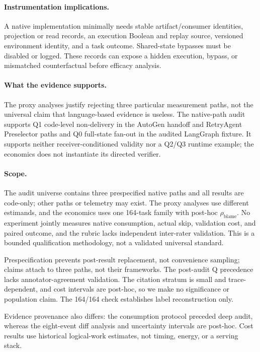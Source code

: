 \documentclass[letterpaper]{article} %
\begin{document}
\paragraph{Instrumentation implications.}
A native implementation minimally needs stable artifact/consumer identities,
projection or read records, an execution Boolean and replay source, versioned
environment identity, and a task outcome. Shared-state bypasses must be
disabled or logged. These records can expose a hidden execution, bypass, or
mismatched counterfactual before efficacy analysis.

\paragraph{What the evidence supports.}
The proxy analyses justify rejecting three particular measurement paths, not
the universal claim that language-based evidence is useless. The native-path
audit supports Q1 code-level non-delivery in the AutoGen handoff and RetryAgent
Preselector paths and Q0 full-state fan-out in the audited LangGraph fixture.
It supports neither receiver-conditioned validity nor a Q2/Q3 runtime example;
the economics does not instantiate its directed verifier.

\paragraph{Scope.}
The audit universe contains three prespecified native paths and all results are
code-only; other paths or telemetry may exist. The proxy analyses use different
estimands, and the economics uses one 164-task family with post-hoc
$\rho_{\mathrm{blame}}$. No experiment jointly measures native consumption,
actual skip, validation cost, and paired outcome, and the rubric lacks
independent inter-rater validation. This is a bounded qualification methodology,
not a validated universal standard.

Prespecification prevents post-result replacement, not convenience sampling;
claims attach to three paths, not their frameworks. The post-audit Q precedence
lacks annotator-agreement validation. The citation stratum is small and
trace-dependent, and cost intervals are post-hoc, so we make no significance
or population claim. The 164/164 check establishes label reconstruction only.

Evidence provenance also differs: the consumption protocol preceded deep
audit, whereas the eight-event diff analysis and uncertainty intervals are
post-hoc. Cost results use historical logical-work estimates, not timing,
energy, or a serving stack.
\end{document}
